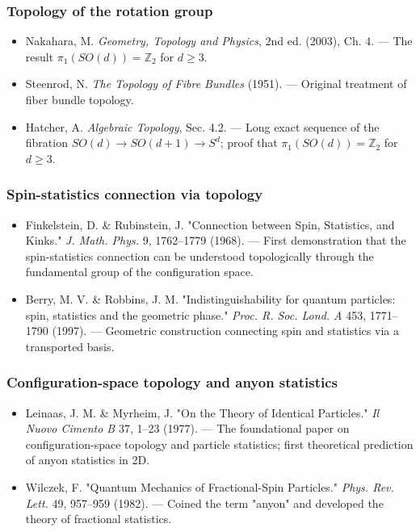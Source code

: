 \documentclass[aps,prd,preprint,superscriptaddress,longbibliography,floatfix]{revtex4-2}
\theoremstyle{remark}
\begin{document}
\subsubsection{Topology of the rotation group}


\begin{itemize}
  \item Nakahara, M. \textit{Geometry, Topology and Physics}, 2nd ed. (2003), Ch. 4. --- The result $\pi_{1}(SO(d)) = \mathbb{Z}_{2}$ for $d \geq 3$.
  \item Steenrod, N. \textit{The Topology of Fibre Bundles} (1951). --- Original treatment of fiber bundle topology.
  \item Hatcher, A. \textit{Algebraic Topology}, Sec. 4.2. --- Long exact sequence of the fibration $SO(d) \to SO(d+1) \to S^{d}$; proof that $\pi_{1}(SO(d)) = \mathbb{Z}_{2}$ for $d \geq 3$.
\end{itemize}


\subsubsection{Spin-statistics connection via topology}


\begin{itemize}
  \item Finkelstein, D. \& Rubinstein, J. "Connection between Spin, Statistics, and Kinks." \textit{J. Math. Phys.} 9, 1762--1779 (1968). --- First demonstration that the spin-statistics connection can be understood topologically through the fundamental group of the configuration space.
  \item Berry, M. V. \& Robbins, J. M. "Indistinguishability for quantum particles: spin, statistics and the geometric phase." \textit{Proc. R. Soc. Lond. A} 453, 1771--1790 (1997). --- Geometric construction connecting spin and statistics via a transported basis.
\end{itemize}


\subsubsection{Configuration-space topology and anyon statistics}


\begin{itemize}
  \item Leinaas, J. M. \& Myrheim, J. "On the Theory of Identical Particles." \textit{Il Nuovo Cimento B} 37, 1--23 (1977). --- The foundational paper on configuration-space topology and particle statistics; first theoretical prediction of anyon statistics in 2D.
  \item Wilczek, F. "Quantum Mechanics of Fractional-Spin Particles." \textit{Phys. Rev. Lett.} 49, 957--959 (1982). --- Coined the term "anyon" and developed the theory of fractional statistics.
\end{itemize}
\end{document}
